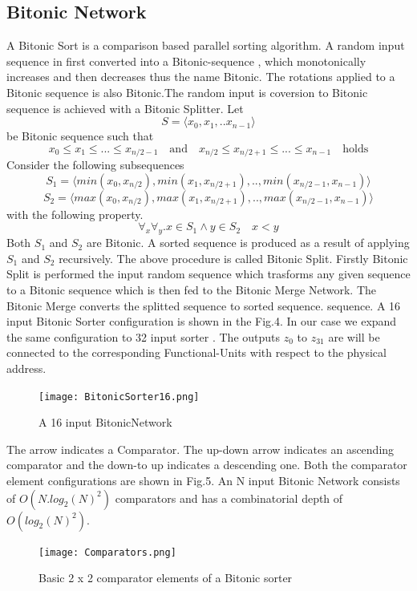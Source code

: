 \documentclass[adraft]{eptcs}
\begin{document}
		\subsection{Bitonic Network}
			    A Bitonic Sort\cite{bitonic_ref} is a comparison based parallel sorting algorithm. A random input sequence in first converted into a Bitonic-sequence , which monotonically increases and then decreases thus the name Bitonic.
			    The rotations applied to a Bitonic sequence is also Bitonic.The random input is coversion to Bitonic sequence is achieved with a Bitonic Splitter.\newline
			    Let \[ 
				  S = \langle x_0,x_1,..x_{n-1}\rangle 
				\] be Bitonic sequence such that
				\[
				    x_0 \leq x_1 \leq ... \leq x_{n/2-1} \quad \textrm{and} \quad  x_{n/2} \leq x_{n/2+1} \leq ... \leq x_{n-1}  \quad \textrm{holds}
				\]
			    Consider the following subsequences
				\[
				  S_{1} =  \langle min(x_0,x_{n/2}), min(x_1,x_{n/2+1}),..,min(x_{n/2-1},x_{n-1})\rangle
				\]
				\[
				  S_{2} =  \langle max(x_0,x_{n/2}), max(x_1,x_{n/2+1}),..,max(x_{n/2-1},x_{n-1})\rangle
				\]
			    with the following property.
				\[
				  \forall _{x} \forall _{y}. x \in S_{1}  \wedge  y \in S_{2} \quad x < y
				\]
			    Both $S_{1}$ and $S_{2}$ are Bitonic. A sorted sequence is produced as a result of applying $S_{1}$ and $S_{2}$ recursively. The above procedure is called Bitonic Split. Firstly Bitonic Split is performed the input random sequence which 
			    trasforms any given sequence to a Bitonic sequence which is then fed to the Bitonic Merge Network. The Bitonic Merge converts the splitted sequence to sorted sequence.
			    sequence. A 16 input Bitonic Sorter configuration is shown in the Fig.4. In our case we expand the same configuration to 32 input sorter . The outputs $z_{0}$ to $z_{31}$ are will
			    be connected to the corresponding Functional-Units with respect to the physical address.
				    \begin{figure}[!ht]
					      \texttt{[image: BitonicSorter16.png]}
					    \caption{A 16 input BitonicNetwork}
				    \end{figure}
			    The arrow indicates a Comparator. The up-down arrow indicates an ascending comparator and the down-to up indicates a descending one. Both the comparator element configurations are shown in Fig.5. An N input Bitonic Network
			    consists of $O(N.log_{2}(N)^{2})$ comparators and has a combinatorial depth of $O(log_{2}(N)^{2})$.
				    \begin{figure}[!ht]
					      \texttt{[image: Comparators.png]}
					    \caption{Basic 2 x 2 comparator elements of a Bitonic sorter}
				    \end{figure}
\end{document}
